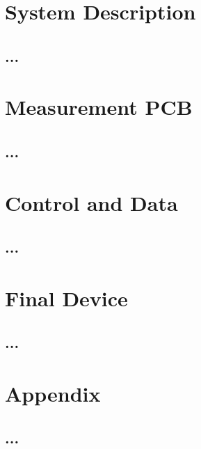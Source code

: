 \documentclass[11pt,a4paper]{report}
\begin{document}
\chapter{System Description}
\section{...}

\chapter{Measurement PCB}
\section{...}

\chapter{Control and Data}
\section{...}

\chapter{Final Device}
\section{...}

\chapter{Appendix}
\section{...}
\listofalgorithms
\listoffigures
\listoftables
\end{document}
